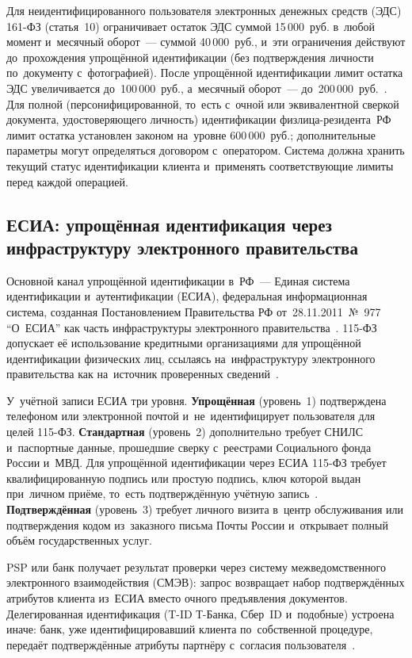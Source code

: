 Для неидентифицированного пользователя электронных денежных средств (ЭДС)
161-ФЗ (статья~10) ограничивает остаток ЭДС суммой 15\,000~руб. в~любой момент
и~месячный оборот~--- суммой 40\,000~руб., и~эти ограничения действуют
до~прохождения упрощённой идентификации (без подтверждения личности
по~документу с~фотографией). После упрощённой идентификации лимит остатка ЭДС
увеличивается до~100\,000~руб., а~месячный оборот~---
до~200\,000~руб.~\cite{fz-161}. Для полной (персонифицированной, то~есть
с~очной или эквивалентной сверкой документа, удостоверяющего личность)
идентификации физлица-резидента~РФ лимит остатка установлен законом на~уровне
600\,000~руб.; дополнительные параметры могут определяться договором
с~оператором. Система должна хранить текущий статус идентификации клиента
и~применять соответствующие лимиты перед каждой операцией.

\subsection*{ЕСИА: упрощённая идентификация через инфраструктуру электронного правительства}

Основной канал упрощённой идентификации в~РФ~--- Единая система идентификации
и~аутентификации (ЕСИА), федеральная информационная система, созданная
Постановлением Правительства РФ от~28.11.2011~№~977 \enquote{О~ЕСИА} как часть
инфраструктуры электронного правительства~\cite{esia-pp977}. 115-ФЗ допускает
её использование кредитными организациями для упрощённой идентификации
физических лиц, ссылаясь на~инфраструктуру электронного правительства как
на~источник проверенных сведений~\cite{fz-115}.

У~учётной записи ЕСИА три уровня. \textbf{Упрощённая} (уровень~1)
подтверждена телефоном или электронной почтой и~не~идентифицирует пользователя для целей
115-ФЗ. \textbf{Стандартная} (уровень~2) дополнительно требует СНИЛС
и~паспортные данные, прошедшие сверку с~реестрами Социального фонда России
и~МВД. Для упрощённой идентификации через ЕСИА 115-ФЗ требует
квалифицированную подпись или простую подпись, ключ которой выдан при~личном
приёме, то~есть подтверждённую учётную запись~\cite{fz-115}.
\textbf{Подтверждённая} (уровень~3) требует личного визита в~центр обслуживания
или подтверждения кодом из~заказного письма Почты России и~открывает полный
объём государственных услуг.

PSP или банк получает результат проверки через систему межведомственного
электронного взаимодействия (СМЭВ): запрос возвращает набор
подтверждённых атрибутов клиента из~ЕСИА вместо очного предъявления документов.
Делегированная идентификация (T-ID Т-Банка, Сбер~ID и~подобные) устроена
иначе: банк, уже идентифицировавший клиента по~собственной процедуре, передаёт
подтверждённые атрибуты партнёру с~согласия пользователя~\cite{tbank-t-id}.

